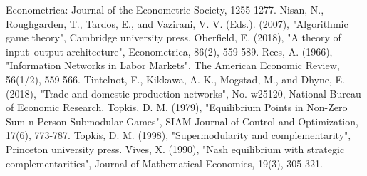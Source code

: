 \documentclass[12pt]{article}
\theoremstyle{definition}
\begin{document}
\begin{thebibliography}{99}
	Econometrica: Journal of the Econometric Society, 1255-1277.
	Nisan, N., Roughgarden, T., Tardos, E., and Vazirani, V. V. (Eds.). (2007),
	"Algorithmic game theory",
	Cambridge university press.
	Oberfield, E. (2018),
	"A theory of input–output architecture",
	Econometrica, 86(2), 559-589.
	Rees, A. (1966),
	"Information Networks in Labor Markets",
	The American Economic Review, 56(1/2), 559-566.
	Tintelnot, F., Kikkawa, A. K., Mogstad, M., and Dhyne, E. (2018),
	"Trade and domestic production networks",
	No. w25120, National Bureau of Economic Research.
	Topkis, D. M. (1979),
	"Equilibrium Points in Non-Zero Sum n-Person Submodular Games",
	SIAM Journal of Control and Optimization, 17(6), 773-787.
	Topkis, D. M. (1998),
	"Supermodularity and complementarity",
	Princeton university press.
	Vives, X. (1990),
	"Nash equilibrium with strategic complementarities",
	Journal of Mathematical Economics, 19(3), 305-321.
\end{thebibliography}
\end{document}
